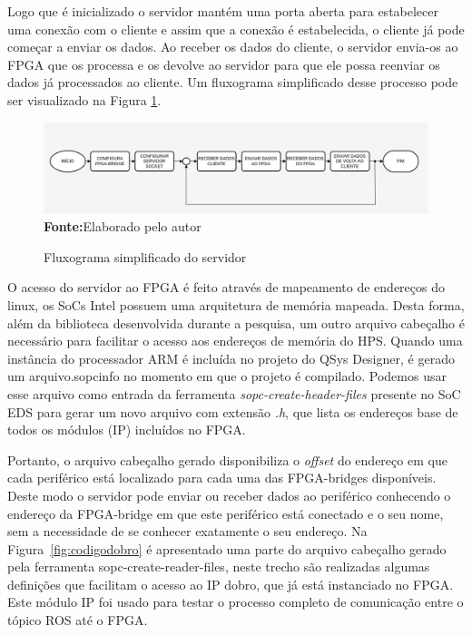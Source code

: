 Logo que é inicializado o servidor mantém uma porta aberta para estabelecer uma conexão com o cliente e assim que a conexão é estabelecida, o cliente já pode começar a enviar os dados. Ao receber os dados do cliente, o servidor envia-os ao FPGA que os processa e os devolve ao servidor para que ele possa reenviar os dados já processados ao cliente. Um fluxograma simplificado desse processo pode ser visualizado na Figura \ref{fig:fluxoServidor}.

\begin{figure}[ht]
	\caption{Fluxograma simplificado do servidor}
	\begin{center}
		\includegraphics[scale=0.41]{imagens/fluxogramaServidor.png}\\
		{\small \textbf{Fonte:}Elaborado pelo autor}
    \end{center}\label{fig:fluxoServidor}
\end{figure} 

O acesso do servidor ao FPGA é feito através de mapeamento de endereços do linux, os SoCs Intel possuem uma arquitetura de memória mapeada. Desta forma, além da biblioteca desenvolvida durante a pesquisa, um outro arquivo cabeçalho é necessário para facilitar o acesso aos endereços de memória do HPS\@. Quando uma instância do processador ARM é incluída no projeto do QSys Designer, é gerado um arquivo.sopcinfo no momento em que o projeto é compilado. Podemos usar esse arquivo como entrada da ferramenta \textit{sopc-create-header-files} presente no SoC EDS para gerar um novo arquivo com extensão \textit{.h}, que lista os endereços base de todos os módulos (IP) incluídos no FPGA\@. 

Portanto, o arquivo cabeçalho gerado disponibiliza o \textit{offset} do endereço em que cada periférico está localizado para cada uma das FPGA-bridges disponíveis. Deste modo o servidor pode enviar ou receber dados ao periférico conhecendo o endereço da FPGA-bridge em que este periférico está conectado e o seu nome, sem a necessidade de se conhecer exatamente o seu endereço. Na Figura~\ref{fig:codigodobro} é apresentado uma parte do arquivo cabeçalho gerado pela ferramenta sopc-create-reader-files, neste trecho são realizadas algumas definições que facilitam o acesso ao IP dobro, que já está instanciado no FPGA. Este módulo IP foi usado para testar o processo completo de comunicação entre o tópico ROS até o FPGA.

